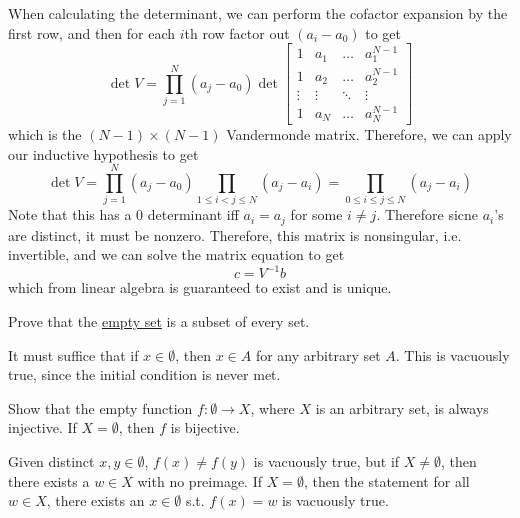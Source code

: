 \begin{solution}
\begin{equation}
    \end{equation}
    When calculating the determinant, we can perform the cofactor expansion by the first row, and then for each $i$th row factor out $(a_i - a_0)$ to get 
    \begin{equation}
      \det V = \prod_{j=1}^{N} (a_j - a_0) \det
      \begin{bmatrix}
        1 & a_1 & \ldots & a_1^{N-1} \\
        1 & a_2 & \ldots & a_2^{N-1} \\
        \vdots & \vdots & \ddots & \vdots \\
        1 & a_N & \ldots & a_N^{N-1}
      \end{bmatrix}
    \end{equation}
    which is the $(N-1) \times (N-1)$ Vandermonde matrix. Therefore, we can apply our inductive hypothesis to get 
    \begin{equation}
      \det V = \prod_{j=1}^N (a_j - a_0) \prod_{1 \leq i < j \leq N} (a_j - a_i) = \prod_{0 \leq i \leq j \leq N} (a_j - a_i)
    \end{equation}
    Note that this has a $0$ determinant iff $a_i = a_j$ for some $i \neq j$. Therefore sicne $a_i$'s are distinct, it must be nonzero. Therefore, this matrix is nonsingular, i.e. invertible, and we can solve the matrix equation to get 
    \begin{equation}
      c = V^{-1} b
    \end{equation}
    which from linear algebra is guaranteed to exist and is unique. 
  \end{solution}
  
  \begin{exercise}[Rudin 2.1]
    Prove that the \hyperref[st-def:empty-set]{empty set} is a subset of every set. 
  \end{exercise}
  \begin{solution}
    It must suffice that if $x \in \emptyset$, then $x \in A$ for any arbitrary set $A$. This is vacuously true, since the initial condition is never met. 
  \end{solution}

  \begin{exercise}
    Show that the empty function $f: \emptyset \rightarrow X$, where $X$ is an arbitrary set, is always injective. If $X = \emptyset$, then $f$ is bijective. 
  \end{exercise}
  \begin{solution}
    Given distinct $x, y \in \emptyset$, $f(x) \neq f(y)$ is vacuously true, but if $X \neq \emptyset$, then there exists a $w \in X$ with no preimage. If $X = \emptyset$, then the statement for all $w \in X$, there exists an $x \in \emptyset$ s.t. $f(x) = w$ is vacuously true. 
  \end{solution}

